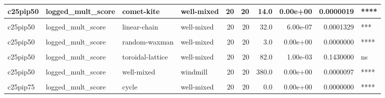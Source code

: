 \documentclass[
]{book}
\begin{document}
\begin{table}
\begin{tabular}{l|l|l|l|r|r|r|r|r|l}
\hline
c25pip50 & logged\_mult\_score & comet-kite & well-mixed & 20 & 20 & 14.0 & 0.00e+00 & 0.0000019 & ****\\
\hline
\cellcolor{gray!6}{c25pip50} & \cellcolor{gray!6}{logged\_mult\_score} & \cellcolor{gray!6}{cycle} & \cellcolor{gray!6}{well-mixed} & \cellcolor{gray!6}{20} & \cellcolor{gray!6}{20} & \cellcolor{gray!6}{28.0} & \cellcolor{gray!6}{3.00e-07} & \cellcolor{gray!6}{0.0000578} & \cellcolor{gray!6}{****}\\
\hline
c25pip50 & logged\_mult\_score & linear-chain & well-mixed & 20 & 20 & 32.0 & 6.00e-07 & 0.0001329 & ***\\
\hline
\cellcolor{gray!6}{c25pip50} & \cellcolor{gray!6}{logged\_mult\_score} & \cellcolor{gray!6}{random-barabasi-albert} & \cellcolor{gray!6}{well-mixed} & \cellcolor{gray!6}{20} & \cellcolor{gray!6}{20} & \cellcolor{gray!6}{0.0} & \cellcolor{gray!6}{0.00e+00} & \cellcolor{gray!6}{0.0000000} & \cellcolor{gray!6}{****}\\
\hline
c25pip50 & logged\_mult\_score & random-waxman & well-mixed & 20 & 20 & 3.0 & 0.00e+00 & 0.0000000 & ****\\
\hline
\cellcolor{gray!6}{c25pip50} & \cellcolor{gray!6}{logged\_mult\_score} & \cellcolor{gray!6}{star} & \cellcolor{gray!6}{well-mixed} & \cellcolor{gray!6}{20} & \cellcolor{gray!6}{20} & \cellcolor{gray!6}{400.0} & \cellcolor{gray!6}{0.00e+00} & \cellcolor{gray!6}{0.0000000} & \cellcolor{gray!6}{****}\\
\hline
c25pip50 & logged\_mult\_score & toroidal-lattice & well-mixed & 20 & 20 & 82.0 & 1.00e-03 & 0.1430000 & ns\\
\hline
\cellcolor{gray!6}{c25pip50} & \cellcolor{gray!6}{logged\_mult\_score} & \cellcolor{gray!6}{well-mixed} & \cellcolor{gray!6}{wheel} & \cellcolor{gray!6}{20} & \cellcolor{gray!6}{20} & \cellcolor{gray!6}{0.0} & \cellcolor{gray!6}{0.00e+00} & \cellcolor{gray!6}{0.0000000} & \cellcolor{gray!6}{****}\\
\hline
c25pip50 & logged\_mult\_score & well-mixed & windmill & 20 & 20 & 380.0 & 0.00e+00 & 0.0000097 & ****\\
\hline
\cellcolor{gray!6}{c25pip75} & \cellcolor{gray!6}{logged\_mult\_score} & \cellcolor{gray!6}{comet-kite} & \cellcolor{gray!6}{well-mixed} & \cellcolor{gray!6}{20} & \cellcolor{gray!6}{20} & \cellcolor{gray!6}{2.0} & \cellcolor{gray!6}{0.00e+00} & \cellcolor{gray!6}{0.0000000} & \cellcolor{gray!6}{****}\\
\hline
c25pip75 & logged\_mult\_score & cycle & well-mixed & 20 & 20 & 0.0 & 0.00e+00 & 0.0000000 & ****\\

\end{tabular}
\end{table}
\end{document}
